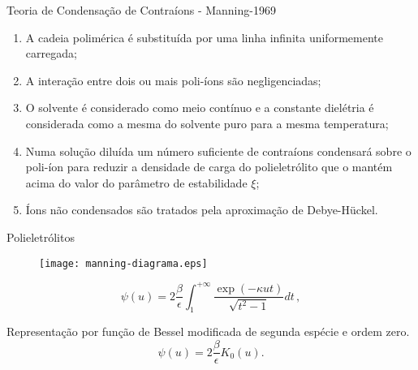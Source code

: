 \documentclass{beamer}
\begin{document}
\begin{frame}{Teoria de Condensação de Contraíons - Manning-1969}


\begin{enumerate}
	\item A cadeia polimérica é substituída por uma 
		linha infinita uniformemente carregada;
	\item A interação entre dois ou mais poli-íons 
		são negligenciadas; 
	\item O solvente é considerado como meio contínuo
		e a constante dielétria é considerada 
		como a mesma do solvente puro para a 
		mesma temperatura; 
	\item Numa solução diluída um número suficiente de 
		contraíons condensará sobre o poli-íon 
		para reduzir a densidade de carga do polieletrólito 
		que o mantém acima do valor do parâmetro de 
		estabilidade $\xi$;
	\item Íons não condensados são tratados pela aproximação de 
		Debye-H{\"u}ckel.
	\end{enumerate}
\end{frame}
\begin{frame}{Polieletrólitos}
	\begin{figure}
		\texttt{[image: manning-diagrama.eps]}
	\end{figure}

\begin{equation}
 \psi(u) = 2\frac{\beta}{\epsilon}\int^{+\infty}_{1} \frac{\exp(-\kappa u t)}{\sqrt{t^2-1}}dt\,,
\end{equation}
	\begin{block}{Representação por função de Bessel modificada de segunda espécie e ordem zero.}
	\begin{equation}
 \psi(u) = 2\frac{\beta}{\epsilon}  K_0(u).
	\label{eq:manning_sol}
\end{equation}
	\end{block}
\end{frame}
\end{document}
